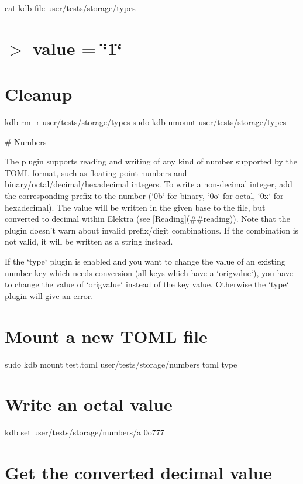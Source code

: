 cat {\ttfamily kdb file user/tests/storage/types} \hypertarget{autotoc_md693_autotoc_md724}{}\section{$>$ value = \char`\"{}1\char`\"{}}\label{autotoc_md693_autotoc_md724}
\hypertarget{autotoc_md693_autotoc_md725}{}\section{Cleanup}\label{autotoc_md693_autotoc_md725}
kdb rm -\/r user/tests/storage/types sudo kdb umount user/tests/storage/types 
\begin{DoxyCode}
# Numbers

The plugin supports reading and writing of any kind of number supported by the TOML format, such as
       floating point numbers and binary/octal/decimal/hexadecimal integers.
To write a non-decimal integer, add the corresponding prefix to the number (`0b` for binary, `0o` for
       octal, `0x` for hexadecimal).
The value will be written in the given base to the file, but converted to decimal within Elektra (see
       [Reading](##reading)).
Note that the plugin doesn't warn about invalid prefix/digit combinations. If the combination is not valid,
       it will be written as a string instead.

If the `type` plugin is enabled and you want to change the value of an existing number key which needs
       conversion (all keys which have a `origvalue`),
you have to change the value of `origvalue` instead of the key value. Otherwise the `type` plugin will give
       an error.
\end{DoxyCode}
 \hypertarget{autotoc_md693_autotoc_md726}{}\section{Mount a new T\+O\+M\+L file}\label{autotoc_md693_autotoc_md726}
sudo kdb mount test.\+toml user/tests/storage/numbers toml type\hypertarget{autotoc_md693_autotoc_md727}{}\section{Write an octal value}\label{autotoc_md693_autotoc_md727}
kdb set \textquotesingle{}user/tests/storage/numbers/a\textquotesingle{} \textquotesingle{}0o777\textquotesingle{}\hypertarget{autotoc_md693_autotoc_md728}{}\section{Get the converted decimal value}\label{autotoc_md693_autotoc_md728}
